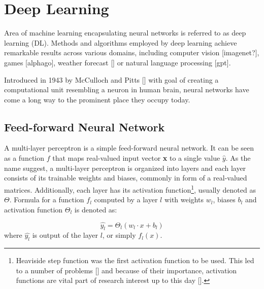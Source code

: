 
\section{Deep Learning}

Area of machine learning encapsulating neural networks is referred to as deep learning (DL). Methods and algorithms employed by deep learning achieve remarkable results across various domains, including computer vision [imagenet?], games [alphago], weather forecast [] or natural language processing [gpt].

Introduced in 1943 by McCulloch and Pitts [] with goal of creating a computational unit resembling a neuron in human brain, neural networks have come a long way to the prominent place they occupy today.


\subsection*{Feed-forward Neural Network}

A multi-layer perceptron is a simple feed-forward neural network. It can be seen as a function $f$ that maps real-valued input vector \textbf{x} to a single value $\hat{y}$. As the name suggest, a multi-layer perceptron is organized into layers and each layer consists of its trainable weights and biases, commonly in form of a real-valued matrices. Additionally, each layer has its activation function\footnote{Heaviside step function was the first activation function to be used. This led to a number of problems [] and because of their importance, activation functions are vital part of research interest up to this day [].}, usually denoted as $\Theta$. Formula for a function $f_l$ computed by a layer $l$ with weights $w_l$, biases $b_l$ and activation function $\Theta_l$ is denoted as:

\begin{equation}
\hat{y_l} = \Theta_l(w_l \cdot x + b_l)
\end{equation}
where $\hat{y_l}$ is output of the layer $l$, or simply $f_l(x)$.



